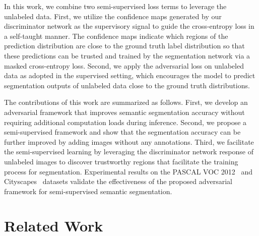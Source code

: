 \documentclass{bmvc2k}
\begin{document}
	In this work, we combine two semi-supervised loss terms to leverage the unlabeled data.
	First, we utilize the confidence maps generated by our discriminator network as the supervisory signal to guide the cross-entropy loss in a self-taught manner.
	The confidence maps indicate which regions of the prediction distribution are close to the ground truth label distribution so that these predictions can be trusted and trained by the segmentation network via a masked cross-entropy loss.
	Second, we apply the adversarial loss on unlabeled data as adopted in the supervised setting, which encourages the model to predict segmentation outputs of unlabeled data close to the ground truth distributions.
	
	The contributions of this work are summarized as follows. First, we develop an adversarial framework that improves semantic segmentation accuracy without requiring additional computation loads during inference.
	Second, we propose a semi-supervised framework and show that the segmentation accuracy can be further improved by adding images without any annotations.
	Third, we facilitate the semi-supervised learning by leveraging the discriminator network response of unlabeled images to discover trustworthy regions that facilitate 
	the training process for segmentation.
	Experimental results on the PASCAL VOC 2012~\cite{pascal} and Cityscapes~\cite{cityscapes} datasets validate the effectiveness of the proposed adversarial framework for semi-supervised semantic segmentation.
	
	\section{Related Work}
	
\end{document}
